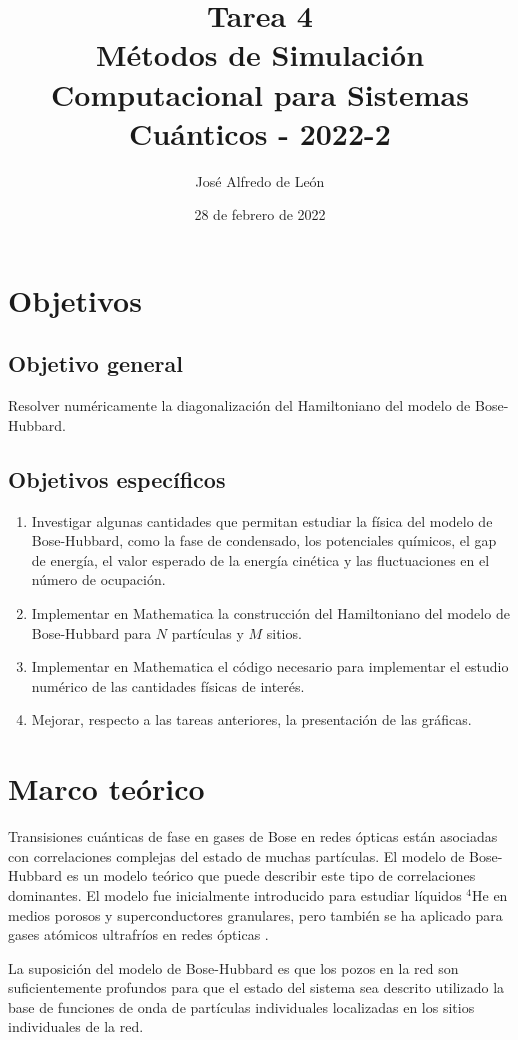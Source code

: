 \documentclass[11pt,letterpaper]{article}
\author{José Alfredo de León}
\title{Tarea 4\\
\large{Métodos de Simulación Computacional para Sistemas Cuánticos - 2022-2}}
\begin{document}
\date{28 de febrero de 2022}
\maketitle

\section{Objetivos}
\subsection{Objetivo general}
Resolver numéricamente la diagonalización del Hamiltoniano del modelo de Bose-Hubbard.

\subsection{Objetivos específicos}
\begin{enumerate}
\item Investigar algunas cantidades que permitan estudiar la física
del modelo de Bose-Hubbard, como la fase de condensado, los potenciales 
químicos, el gap de energía, el valor esperado de la energía cinética 
y las fluctuaciones en el número de ocupación.
\item Implementar en Mathematica la construcción del Hamiltoniano 
del modelo de Bose-Hubbard para $N$ partículas y $M$ sitios. 
\item Implementar en Mathematica el código necesario para implementar
el estudio numérico de las cantidades físicas de interés.
\item Mejorar, respecto a las tareas anteriores, la presentación
de las gráficas. 
\end{enumerate}

\section{Marco teórico}
Transisiones cuánticas de fase en gases de Bose en redes ópticas 
están asociadas con correlaciones complejas del estado de muchas partículas.
El modelo de Bose-Hubbard es un modelo teórico que puede describir 
este tipo de correlaciones dominantes. El modelo fue inicialmente 
introducido para estudiar líquidos ${}^4$He en medios porosos y
superconductores granulares, pero también se ha aplicado para 
gases atómicos ultrafríos en redes ópticas \cite{}.

La suposición del modelo de Bose-Hubbard es que los pozos en la red son
suficientemente profundos para que el estado del sistema sea descrito
utilizado la base de funciones de onda de partículas individuales
localizadas en los sitios individuales de la red. 
\end{document}
